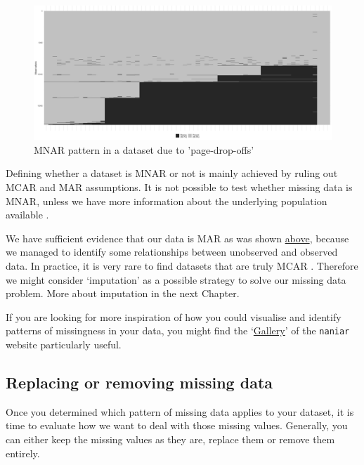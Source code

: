 \documentclass[
]{book}
\begin{document}
\begin{figure}

{\centering \includegraphics[width=26.67in]{images/chapter_07_img/03_missing_data/00_mnar_example} 

}

\caption{MNAR pattern in a dataset due to 'page-drop-offs'}\label{fig:mnar-example}
\end{figure}

Defining whether a dataset is MNAR or not is mainly achieved by ruling out MCAR and MAR assumptions. It is not possible to test whether missing data is MNAR, unless we have more information about the underlying population available \citep{van2020rebutting}.

We have sufficient evidence that our data is MAR as was shown \protect\hyperlink{missing-at-random-mar}{above}, because we managed to identify some relationships between unobserved and observed data. In practice, it is very rare to find datasets that are truly MCAR \citep{van-buuren-2018}. Therefore we might consider `imputation' as a possible strategy to solve our missing data problem. More about imputation in the next Chapter.

If you are looking for more inspiration of how you could visualise and identify patterns of missingness in your data, you might find the `\href{https://naniar.njtierney.com/articles/naniar-visualisation.html}{Gallery}' of the \texttt{naniar} website particularly useful.

\hypertarget{replacing-removing-missing-data}{%
\subsection{Replacing or removing missing data}\label{replacing-removing-missing-data}}

Once you determined which pattern of missing data applies to your dataset, it is time to evaluate how we want to deal with those missing values. Generally, you can either keep the missing values as they are, replace them or remove them entirely.
\end{document}
